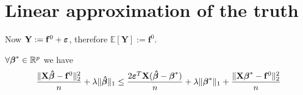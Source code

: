 \section{Linear approximation of the truth}

Now $\mathbf{Y} :=\mathbf{f}^{0} + \boldsymbol{\varepsilon}$, therefore $\mathbb{E} [\mathbf{Y}] :=\mathbf{f}^{0}$.


\begin{lemma}
    $\forall \boldsymbol{\beta}^* \in \mathbb{R}^p$ we have
    \begin{equation}
        \frac{\|\mathbf{X} \boldsymbol{\hat{\beta}} - \mathbf{f}^0 \|_{2}^{2}}{n} + \lambda\| \boldsymbol{\hat{\beta}} \|_{1} \leq \frac{2 \boldsymbol{\varepsilon}^T \mathbf{X} (\boldsymbol{\hat{\beta}} - \boldsymbol{\beta}^*)}{n} + \lambda \| \boldsymbol{\beta}^*\|_{1} + \frac{\|\mathbf{X} \boldsymbol{\beta}^* - \mathbf{f}^0\|_{2}^{2}}{n}
    \end{equation}
\end{lemma}
